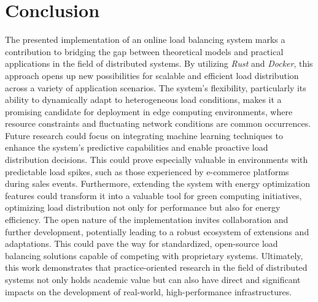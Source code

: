 \documentclass[twocolumn]{webofc}
\begin{document}
    \section{Conclusion}
    The presented implementation of an online load balancing system marks a contribution to bridging the gap between theoretical models and practical applications in the field of distributed systems. By utilizing \textit{Rust} and \textit{Docker}, this approach opens up new possibilities for scalable and efficient load distribution across a variety of application scenarios. The system's flexibility, particularly its ability to dynamically adapt to heterogeneous load conditions, makes it a promising candidate for deployment in edge computing environments, where resource constraints and fluctuating network conditions are common occurrences. Future research could focus on integrating machine learning techniques to enhance the system's predictive capabilities and enable proactive load distribution decisions. This could prove especially valuable in environments with predictable load spikes, such as those experienced by e-commerce platforms during sales events. Furthermore, extending the system with energy optimization features could transform it into a valuable tool for green computing initiatives, optimizing load distribution not only for performance but also for energy efficiency. The open nature of the implementation invites collaboration and further development, potentially leading to a robust ecosystem of extensions and adaptations. This could pave the way for standardized, open-source load balancing solutions capable of competing with proprietary systems. Ultimately, this work demonstrates that practice-oriented research in the field of distributed systems not only holds academic value but can also have direct and significant impacts on the development of real-world, high-performance infrastructures.

    
\end{document}
